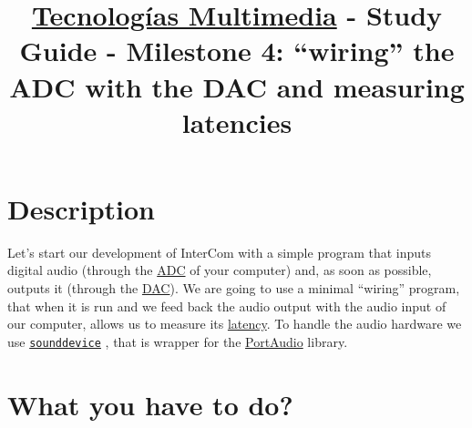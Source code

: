 \title{\href{https://www.ual.es/estudios/grados/presentacion/plandeestudios/asignatura/4015/40154321?idioma=zh_CN}{Tecnologías Multimedia} - Study Guide - Milestone 4: ``wiring'' the ADC with the DAC and measuring latencies}

\maketitle

\section{Description}

Let's start our development of InterCom with a simple program that
inputs digital audio (through the
\href{https://en.wikipedia.org/wiki/Analog-to-digital_converter}{ADC}
of your computer) and, as soon as possible, outputs it (through the
\href{https://en.wikipedia.org/wiki/Digital-to-analog_converter}{DAC}). We
are going to use a minimal ``wiring'' program, that when it is run and
we feed back the audio output with the audio input of our computer,
allows us to measure
its \href{https://en.wikipedia.org/wiki/Latency_(engineering)}{latency}. To
handle the audio hardware we use
\href{https://python-sounddevice.readthedocs.io}{\texttt{sounddevice}}
\cite{sounddevice}, that is wrapper for the
\href{http://www.portaudio.com/}{PortAudio} library.

\section{What you have to do?}

